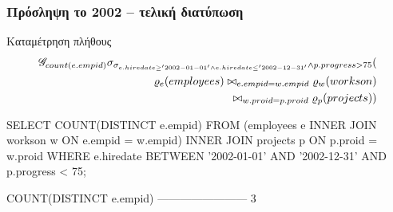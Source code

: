 \begin{frame}
\frametitle{Πρόσληψη το 2002 -- τελική διατύπωση}
\begin{minipage}{\wE}
\vspace{-0.55cm}
  \begin{block}{\small Καταμέτρηση πλήθους}
\[
\begin{split}
    {}_{} \mathscr{G}_{count(e.empid)}    
      \sigma_{\sigma_{e.hiredate\geq'2002-01-01'\wedge e.hiredate\leq'2002-12-31'}
                      \wedge p.progress>75}
      (                           \\
        \varrho_{e} (employees) \bowtie_{e.empid=w.empid} \varrho_{w} (workson)   \\
                                \bowtie_{w.proid=p.proid} \varrho_{p} (projects)
      )
\end{split}
\]
\pause
\vspace{-0.55cm}
\en
\begin{SQL}
  SELECT COUNT(DISTINCT e.empid)
    FROM (employees e INNER JOIN workson  w
                         ON e.empid = w.empid)
                      INNER JOIN projects p
                         ON p.proid = w.proid
   WHERE e.hiredate BETWEEN '2002-01-01' AND '2002-12-31'
     AND p.progress < 75;

 COUNT(DISTINCT e.empid)
------------------------
                       3
\end{SQL}
\el
\end{block}
\end{minipage}
\end{frame}


